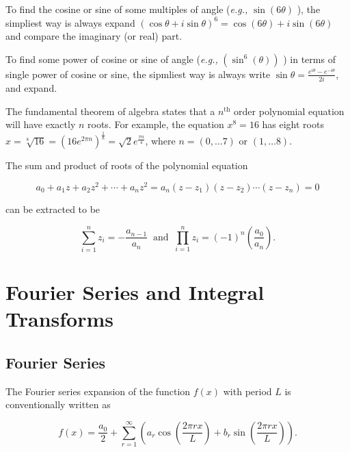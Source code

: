 \documentclass[english,a4paper,12pt]{report}
\begin{document}
To find the cosine or sine of some multiples of angle (\textit{e.g.,} \(\sin (6\theta )\) ), the simpliest way is always expand \((\cos \theta +i\sin \theta )^6 = \cos (6\theta ) + i\sin (6\theta )\) and compare the imaginary (or real) part. 

To find some power of cosine or sine of angle (\textit{e.g.,} \((\sin ^6(\theta ))\) ) in terms of single power of cosine or sine, the sipmliest way is always write \(\sin \theta = \displaystyle \frac{e^{i \theta }-e^{-i \theta }  }{2i} \), and expand. 

The fundamental theorem of algebra states that a \(n^{\text{th}}\) order polynomial equation will have exactly \(n\) roots. For example, the equation \(x^{8} = 16\) has eight roots \(x = \sqrt[8]{16} = (16e^{2\pi n})^{\frac{1}{8} } = \sqrt{2}e^{\frac{\pi n}{4} }\), where \(n = (0,\ldots 7) \text { or } (1,\ldots 8)\).   

The sum and product of roots of the polynomial equation

\begin{equation}
    a_0 + a_1 z + a_2 z ^2 + \cdots + a_{n}z^2 = a_{n}(z - z_1 )(z-z_2 )\cdots (z-z_{n} ) = 0   
\end{equation}

can be extracted to be 

\begin{equation}
    \sum_{i=1}^{n} z_{i} = - \frac{a_{n-1} }{a_{n} } ~\text { and }~ \prod_{i=1}^{n} z_{i} = (-1)^{n} \left(\frac{a_{0} }{a_{n} }\right).     
\end{equation}



\chapter{Fourier Series and Integral Transforms}

\section{Fourier Series}

The Fourier series expansion of the function \(f(x)\) with period \(L\) is conventionally written as 

\begin{equation}
    f(x) = \frac{a_0 }{2} + \sum_{r=1}^{\infty} \left( a_{r} \cos \left( \frac{2\pi rx}{L}  \right) + b_{r} \sin \left( \frac{2\pi rx}{L}  \right)  \right). 
\end{equation}
\end{document}
